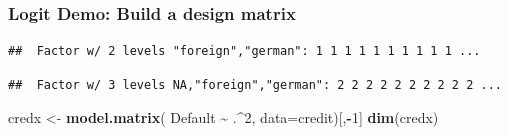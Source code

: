\documentclass[
  shownotes,
  xcolor={svgnames},
  hyperref={colorlinks,citecolor=DarkBlue,linkcolor=DarkRed,urlcolor=DarkBlue}
  , aspectratio=169]{beamer}
\newenvironment{Shaded}{\begin{snugshade}}{\end{snugshade}}
\newcommand{\DataTypeTok}[1]{\textcolor[rgb]{0.13,0.29,0.53}{#1}}
\newcommand{\DecValTok}[1]{\textcolor[rgb]{0.00,0.00,0.81}{#1}}
\newcommand{\KeywordTok}[1]{\textcolor[rgb]{0.13,0.29,0.53}{\textbf{#1}}}
\newcommand{\NormalTok}[1]{#1}
\newcommand{\OperatorTok}[1]{\textcolor[rgb]{0.81,0.36,0.00}{\textbf{#1}}}
\newcommand{\StringTok}[1]{\textcolor[rgb]{0.31,0.60,0.02}{#1}}
\begin{document}
\begin{frame}[fragile]
\frametitle{Logit Demo: Build a design matrix}

\begin{scriptsize}
\begin{Shaded}
\end{Shaded}
\end{scriptsize}

\begin{tiny}
\begin{verbatim}
##  Factor w/ 2 levels "foreign","german": 1 1 1 1 1 1 1 1 1 1 ...
\end{verbatim}
\end{tiny}

\begin{scriptsize}
\begin{Shaded}
\end{Shaded}
\end{scriptsize}

\begin{tiny}
\begin{verbatim}
##  Factor w/ 3 levels NA,"foreign","german": 2 2 2 2 2 2 2 2 2 2 ...
\end{verbatim}
\end{tiny}

\begin{scriptsize}
\begin{Shaded}
\begin{Highlighting}[]
\NormalTok{credx \textless{}{-}}\StringTok{ }\KeywordTok{model.matrix}\NormalTok{( Default }\OperatorTok{\textasciitilde{}}\StringTok{ }\NormalTok{.}\OperatorTok{\^{}}\DecValTok{2}\NormalTok{, }\DataTypeTok{data=}\NormalTok{credit)[,}\OperatorTok{{-}}\DecValTok{1}\NormalTok{]}
\KeywordTok{dim}\NormalTok{(credx)}
\end{Highlighting}
\end{Shaded}
\end{scriptsize}


\end{frame}
\end{document}
